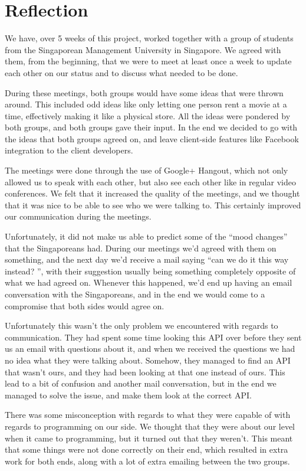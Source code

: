 \chapter{Reflection}
\label{reflection}
We have, over 5 weeks of this project, worked together with a group of students from the Singaporean Management University in Singapore. We agreed with them, from the beginning, that we were to meet at least once a week to update each other on our status and to discuss what needed to be done.

During these meetings, both groups would have some ideas that were thrown around. This included odd ideas like only letting one person rent a movie at a time, effectively making it like a physical store. All the ideas were pondered by both groups, and both groups gave their input. In the end we decided to go with the ideas that both groups agreed on, and leave client-side features like Facebook integration to the client developers.

The meetings were done through the use of Google+ Hangout, which not only allowed us to speak with each other, but also see each other like in regular video conferences. We felt that it increased the quality of the meetings, and we thought that it was nice to be able to see who we were talking to. This certainly improved our communication during the meetings.

Unfortunately, it did not make us able to predict some of the ``mood changes'' that the Singaporeans had. During our meetings we'd agreed with them on something, and the next day we'd receive a mail saying ``can we do it this way instead? '', with their suggestion usually being something completely opposite of what we had agreed on. Whenever this happened, we'd end up having an email conversation with the Singaporeans, and in the end we would come to a compromise that both sides would agree on.

Unfortunately this wasn't the only problem we encountered with regards to communication. They had spent some time looking this API over before they sent us an email with questions about it, and when we received the questions we had no idea what they were talking about. Somehow, they managed to find an API that wasn't ours, and they had been looking at that one instead of ours. This lead to a bit of confusion and another mail conversation, but in the end we managed to solve the issue, and make them look at the correct API.

There was some misconception with regards to what they were capable of with regards to programming on our side. We thought that they were about our level when it came to programming, but it turned out that they weren't. This meant that some things were not done correctly on their end, which resulted in extra work for both ends, along with a lot of extra emailing between the two groups.

